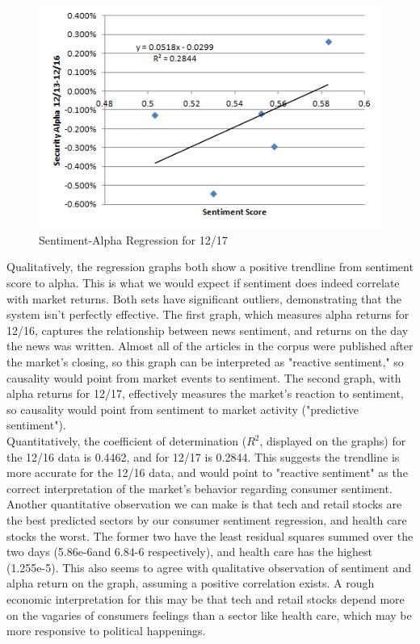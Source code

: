 \documentclass[pageno]{jpaper}
\begin{document}
\begin{figure}
\centering
\includegraphics[width=115mm]{returns2.png}
\caption{Sentiment-Alpha Regression for 12/17}
\label{overflow}
\end{figure}
\indent Qualitatively, the regression graphs both show a positive trendline from sentiment score to alpha. This is what we would expect if sentiment does indeed correlate with market returns. Both sets have significant outliers, demonstrating that the system isn't perfectly effective. The first graph, which measures alpha returns for 12/16, captures the relationship between news sentiment, and returns on the day the news was written. Almost all of the articles in the corpus were published after the market's closing, so this graph can be interpreted as "reactive sentiment," so causality would point from market events to sentiment. The second graph, with alpha returns for 12/17, effectively measures the market's reaction to sentiment, so causality would point from sentiment to market activity ("predictive sentiment"). \\
\indent Quantitatively, the coefficient of determination ($R^2$, displayed on the graphs) for the 12/16 data is 0.4462, and for 12/17 is 0.2844. This suggests the trendline is more accurate for the 12/16 data, and would point to "reactive sentiment" as the correct interpretation of the market's behavior regarding consumer sentiment. \\
\indent Another quantitative observation we can make is that tech and retail stocks are the best predicted sectors by our consumer sentiment regression, and health care stocks the worst. The former two have the least residual squares summed over the two days (5.86e-6and 6.84-6 respectively), and health care has the highest (1.255e-5). This also seems to agree with qualitative observation of sentiment and alpha return on the graph, assuming a positive correlation exists. A rough economic interpretation for this may be that tech and retail stocks depend more on the vagaries of consumers feelings than a sector like health care, which may be more responsive to political happenings.
\end{document}
